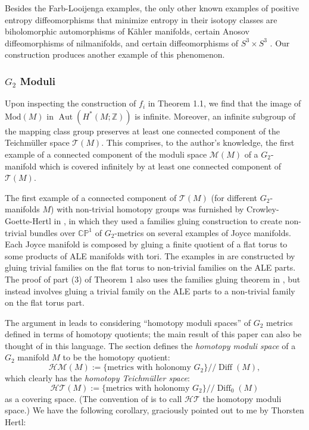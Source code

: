 \documentclass{amsart}
\theoremstyle{theorem}
\theoremstyle{definition}
\theoremstyle{definition}
\theoremstyle{definition}
\theoremstyle{theorem}
\theoremstyle{theorem}
\theoremstyle{theorem}
\theoremstyle{corollary}
\theoremstyle{question}
\theoremstyle{remark}
\DeclareMathOperator{\Aut}{Aut}
\DeclareMathOperator{\Diff}{Diff}
\begin{document}
Besides the Farb-Looijenga examples, the only other known examples of positive entropy diffeomorphisms that minimize entropy in their isotopy classes are biholomorphic automorphisms of K\"ahler manifolds, certain Anosov diffeomorphisms of nilmanifolds, and certain diffeomorphisms of $S^3\times S^3$ \cite{FL, Gromov, Franks, Fried}. Our construction produces another example of this phenomenon.

\subsubsection{$G_2$ Moduli} Upon inspecting the construction of $f_i$ in Theorem 1.1, we find that the image of $\text{Mod}(M)$ in $\Aut(H^*(M; \mathbb{Z}))$ is infinite. Moreover, an infinite subgroup of the mapping class group preserves at least one connected component of the Teichm\"uller space $\mathcal{T}(M)$. This comprises, to the author's knowledge, the first example of a connected component of the moduli space $\mathcal{M}(M)$ of a $G_2$-manifold which is covered infinitely by at least one connected component of $\mathcal{T}(M).$

The first example of a connected component of $\mathcal{T}(M)$ (for different $G_2$-manifolds $M$) with non-trivial homotopy groups was furnished by Crowley-Goette-Hertl in \cite{CGH}, in which they used a families gluing construction to create non-trivial bundles over $\mathbb{CP}^1$ of $G_2$-metrics on several examples of Joyce manifolds. Each Joyce manifold is composed by gluing a finite quotient of a flat torus to some products of ALE manifolds with tori. The examples in \cite{CGH} are constructed by gluing trivial families on the flat torus to non-trivial families on the ALE parts. The proof of part (3) of Theorem 1 also uses the families gluing theorem in \cite{CGH}, but instead involves gluing a trivial family on the ALE parts to a non-trivial family on the flat torus part. 

The argument in \cite{CGH} leads to considering ``homotopy moduli spaces'' of $G_2$ metrics defined in terms of homotopy quotients; the main result of this paper can also be thought of in this language. The section \cite[before Corollary E]{CGH} defines the \emph{homotopy moduli space} of a $G_2$ manifold $M$ to be the homotopy quotient: $$ \mathcal{HM}(M) := \{\text{metrics~with~holonomy~}G_2\} // \Diff(M),$$ which clearly has the \emph{homotopy Teichm\"uller space}: $$\mathcal{HT}(M):= \{\text{metrics~with~holonomy~}G_2\} // \Diff_0(M)$$ as a covering space. (The convention of \cite{CGH} is to call $\mathcal{HT}$ the homotopy moduli space.) We have the following corollary, graciously pointed out to me by Thorsten Hertl:
\end{document}
